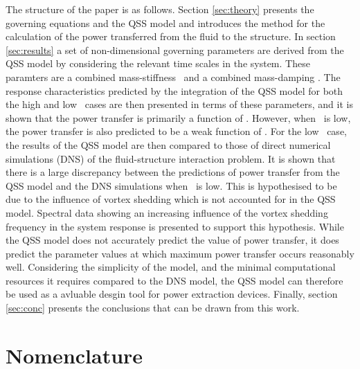 The structure of the paper is as follows. Section \ref{sec:theory} presents the governing equations and the QSS model and introduces the method for the calculation of the power transferred from the fluid to the structure. In section \ref{sec:results} a set of non-dimensional governing parameters are derived from the QSS model by considering the relevant time scales in the system. These paramters are a combined mass-stiffness \massstiff \  and a combined mass-damping \massdamp. The response characteristics predicted by the integration of the QSS model for both the high and low \reynoldsnumber\ cases are then presented in terms of these parameters, and it is shown that the power transfer is primarily a function of \massdamp. However, when \massstiff\ is low, the power transfer is also predicted to be a weak function of \massstiff. For the low \reynoldsnumber\ case, the results of the QSS model are then compared to those of direct numerical simulations (DNS) of the fluid-structure interaction problem. It is shown that there is a large discrepancy between the predictions of power transfer from the QSS model and the DNS simulations when \massstiff\ is low. This is hypothesised to be due to the influence of vortex shedding which is not accounted for in the QSS model. Spectral data showing an increasing influence of the vortex shedding frequency in the system response is presented to support this hypothesis. While the QSS model does not accurately predict the value of power transfer, it does predict the parameter values at which maximum power transfer occurs reasonably well. Considering the simplicity of the model, and the minimal computational resources it requires compared to the DNS model, the QSS model can therefore be used as a avluable desgin tool for power extraction devices. Finally, section \ref{sec:conc} presents the conclusions that can be drawn from this work.
\section*{Nomenclature}

